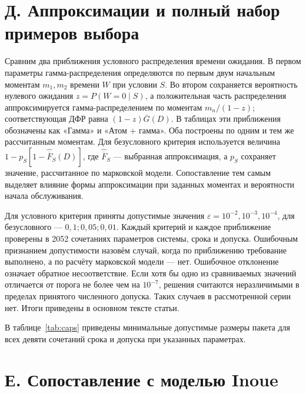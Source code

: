 \section*{Д. Аппроксимации и полный набор примеров выбора}

Сравним два приближения условного распределения времени ожидания. В первом параметры гамма-распределения определяются по первым двум начальным моментам $m_1,m_2$ времени $W$ при условии $S$. Во втором сохраняется вероятность нулевого ожидания $z=P(W=0\mid S)$, а положительная часть распределения аппроксимируется гамма-распределением по моментам $m_n/(1-z)$; соответствующая ДФР равна $(1-z)\overline G(D)$. В таблицах эти приближения обозначены как «Гамма» и «Атом + гамма». Оба построены по одним и тем же рассчитанным моментам. Для безусловного критерия используется величина $1-p_S[1-\widehat{\overline F}_S(D)]$, где $\widehat{\overline F}_S$ --- выбранная аппроксимация, а $p_S$ сохраняет значение, рассчитанное по марковской модели. Сопоставление тем самым выделяет влияние формы аппроксимации при заданных моментах и вероятности начала обслуживания.

Для условного критерия приняты допустимые значения $\varepsilon=10^{-2},10^{-3},10^{-4}$, для безусловного --- $0{,}1;0{,}05;0{,}01$. Каждый критерий и каждое приближение проверены в 2052 сочетаниях параметров системы, срока и допуска. Ошибочным признанием допустимости назовём случай, когда по приближению требование выполнено, а по расчёту марковской модели --- нет. Ошибочное отклонение означает обратное несоответствие. Если хотя бы одно из сравниваемых значений отличается от порога не более чем на $10^{-7}$, решения считаются неразличимыми в пределах принятого численного допуска. Таких случаев в рассмотренной серии нет. Итоги приведены в основном тексте статьи.

В таблице~\ref{tab:caps} приведены минимальные допустимые размеры пакета для всех девяти сочетаний срока и допуска при указанных параметрах.

\begin{table}[htbp]\centering\small
\caption{Наименьшее значение $b\in\{2,\ldots,16\}$, удовлетворяющее условию $\overline F_S(D)\leq\varepsilon$, при $E_3$-обслуживании, $a=1$, $\lambda=0{,}8$, $\gamma=0$. Прочерк --- отсутствие допустимого значения в этом диапазоне}\label{tab:caps}

\end{table}

\section*{Е. Сопоставление с моделью Inoue}

